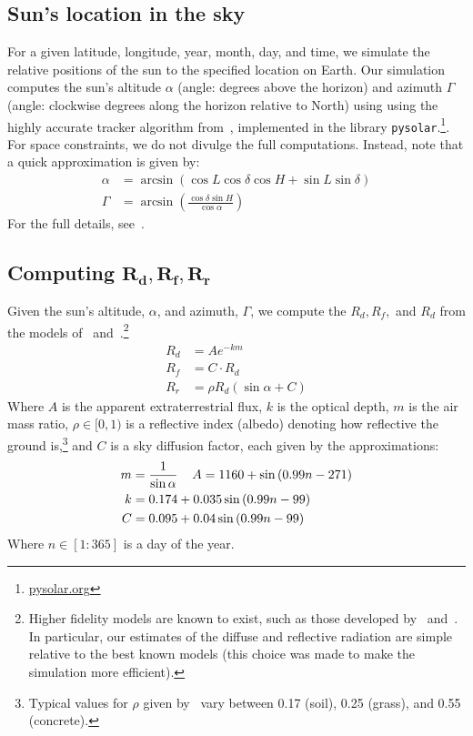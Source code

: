 \documentclass{article}
\begin{document}
{%
\subsection{Sun's location in the sky}
For a given latitude, longitude, year, month, day, and time, we simulate the relative positions of the sun to the specified location on Earth. Our simulation computes the sun's altitude $\alpha$ (angle: degrees above the horizon) and azimuth $\Gamma$ (angle: clockwise degrees along the horizon relative to North) using using the highly accurate tracker algorithm from~\citet{reda2004solar}, implemented in the library \texttt{pysolar}.\footnote{\url{pysolar.org}}. For space constraints, we do not divulge the full computations. Instead, note that a quick approximation is given by:
\begin{align}
\alpha &= \arcsin(\cos L \cos \delta \cos H + \sin L \sin \delta)\\
\Gamma &= \arcsin\left(\frac{\cos \delta \sin H}{\cos \alpha}\right)
\end{align}
For the full details, see~\citet{reda2004solar}.

\subsection{Computing $\pmb{R_d, R_f, R_r}$}
Given the sun's altitude, $\alpha$, and azimuth, $\Gamma$, we compute the $R_d, R_f,$ and $R_d$ from the models of~\citet{threlkeld1957direct,Liu1960} and~\citet{masters2013renewable}.\footnote{Higher fidelity models are known to exist, such as those developed by~\citet{andersen1980comments,klein1977calculation} and~\citet{kamali2006estimating}. In particular, our estimates of the diffuse and reflective radiation are simple relative to the best known models (this choice was made to make the simulation more efficient).}
\begin{align}
R_d &= A e^{-km} \\
R_f &= C \cdot R_d \\
R_r &= \rho R_d (\sin \alpha + C)
\end{align}
Where $A$ is the apparent extraterrestrial flux, $k$ is the optical depth, $m$ is the air mass ratio, $\rho \in [0,1)$ is a reflective index (albedo) denoting how reflective the ground is,\footnote{Typical values for $\rho$ given by~\citet{mcevoy2003practical} vary between 0.17 (soil), 0.25 (grass), and 0.55 (concrete).} and $C$ is a sky diffusion factor, each given by the approximations:
\begin{align}
m&=\frac{1}{\sin \alpha} \hspace{4mm} A = 1160 + \sin \left(0.99 n- 271\right)\\
k&=0.174 + 0.035 \sin\left( 0.99 n - 99\right)\\
C&=0.095 + 0.04 \sin\left(0.99 n-99\right)
\end{align}
Where $n \in [1:365]$ is a day of the year.

}
\end{document}
